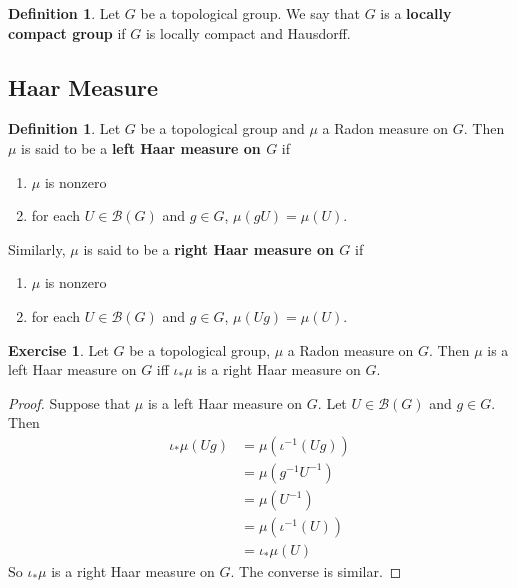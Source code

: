 \documentclass[12pt]{amsart}
\theoremstyle{definition}
\newtheorem{defn}[definition]{Definition}
\newtheorem{ex}[definition]{Exercise}
\newcommand{\MB}{\mathcal{B}}
\begin{document}
	\begin{defn}
		Let $G$ be a topological group. We say that $G$ is a \textbf{locally compact group} if $G$ is locally compact and Hausdorff.
	\end{defn}








	\newpage
	
	\subsection{Haar Measure}
	
	\begin{defn}
		Let $G$ be a topological group and $\mu$ a Radon measure on $G$. Then $\mu$ is said to be a \textbf{left Haar measure on $G$} if 
		\begin{enumerate}
			\item $\mu$ is nonzero  
			\item for each $U \in \MB(G)$ and $g \in G$, $\mu(gU) = \mu(U)$.  
		\end{enumerate}
		Similarly, $\mu$ is said to be a \textbf{right Haar measure on $G$} if 
		\begin{enumerate}
			\item $\mu$ is nonzero  
			\item for each $U \in \MB(G)$ and $g \in G$, $\mu(Ug) = \mu(U)$.  
		\end{enumerate}
	\end{defn}
	
	\begin{ex}
		Let $G$ be a topological group, $\mu$ a Radon measure on $G$. Then $\mu$ is a left Haar measure on $G$ iff $\iota_*\mu$ is a right Haar measure on $G$. 
	\end{ex}
	
	\begin{proof}
		Suppose that $\mu$ is a left Haar measure on $G$. Let $U \in \MB(G)$ and $g \in G$. Then 
		\begin{align*}
			\iota_*\mu(Ug)
			& = \mu(\iota^{-1}(Ug)) \\
			&= \mu (g^{-1}U^{-1}) \\
			&= \mu (U^{-1}) \\
			&= \mu(\iota^{-1}(U)) \\
			&= \iota_*\mu(U)
		\end{align*}
		So $\iota_*\mu$ is a right Haar measure on $G$. The converse is similar.
	\end{proof}
\end{document}
